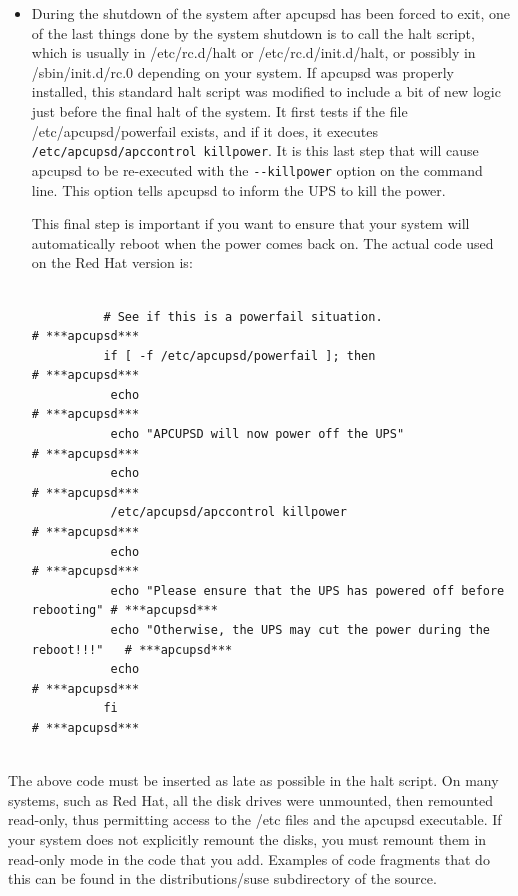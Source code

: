 {{{{{{{{{{{{{{{\begin{itemize}
Note that on Windows NT systems, apcupsd apparently continues to run as a
Service even though the machine is ``shutdown''.  
\item During the shutdown of the system after apcupsd has been forced to exit,
   one of the last things done by the system shutdown is to call the halt script,
   which is usually in /etc/rc.d/halt or /etc/rc.d/init.d/halt, or possibly in
/sbin/init.d/rc.0 depending on your system. If apcupsd was properly installed,
this standard halt script was modified to include a bit of new logic just
before the final halt of the system. It first tests if the file
/etc/apcupsd/powerfail exists, and if it does, it executes {\tt
/etc/apcupsd/apccontrol killpower}. It is this last step that will cause
apcupsd to be re-executed with the {\tt \verb{--{killpower} option on the command
line. This option tells apcupsd to inform the UPS to kill the power.  

This final step is important if you want to ensure that your system will
automatically reboot when the power comes back on. The actual code used on the
Red Hat version is:  

\footnotesize
\begin{verbatim}
          
          # See if this is a powerfail situation.                             # ***apcupsd***
          if [ -f /etc/apcupsd/powerfail ]; then                              # ***apcupsd***
           echo                                                               # ***apcupsd***
           echo "APCUPSD will now power off the UPS"                          # ***apcupsd***
           echo                                                               # ***apcupsd***
           /etc/apcupsd/apccontrol killpower                                  # ***apcupsd***
           echo                                                               # ***apcupsd***
           echo "Please ensure that the UPS has powered off before rebooting" # ***apcupsd***
           echo "Otherwise, the UPS may cut the power during the reboot!!!"   # ***apcupsd***
           echo                                                               # ***apcupsd***
          fi                                                                  # ***apcupsd***
     
\end{verbatim}
\normalsize

\end{itemize}

The above code must be inserted as late as possible in the halt script. On
many systems, such as Red Hat, all the disk drives were unmounted, then
remounted read-only, thus permitting access to the /etc files and the apcupsd
executable. If your system does not explicitly remount the disks, you must
remount them in read-only mode in the code that you add. Examples of code
fragments that do this can be found in the distributions/suse subdirectory of
the source.  

}}}}}}}}}}}}}}}
